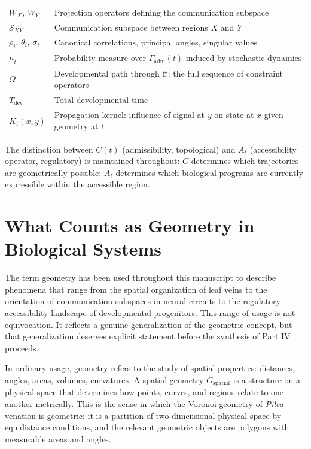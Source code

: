 \documentclass[12pt, a4paper, openany]{book}
\theoremstyle{definition}
\theoremstyle{remark}
\begin{document}
\begin{tabular}{@{}lp{10.5cm}@{}}
$W_X,\,W_Y$ & Projection operators defining the communication subspace \\[4pt]
$\mathcal{S}_{XY}$ & Communication subspace between regions $X$ and $Y$ \\[4pt]
$\rho_i,\,\theta_i,\,\sigma_i$ & Canonical correlations, principal angles, singular values \\[4pt]
$\mu_t$ & Probability measure over $\Gamma_{\mathrm{adm}}(t)$ induced by stochastic dynamics \\[4pt]
$\Omega$ & Developmental path through $\mathcal{C}$: the full sequence of constraint operators \\[4pt]
$T_{\mathrm{dev}}$ & Total developmental time \\[4pt]
$K_t(x,y)$ & Propagation kernel: influence of signal at $y$ on state at $x$ given geometry at $t$ \\[4pt]
\bottomrule
\end{tabular}

\medskip\noindent
The distinction between $C(t)$ (admissibility, topological) and $A_t$ (accessibility operator, regulatory) is maintained throughout: $C$ determines which trajectories are geometrically possible; $A_t$ determines which biological programs are currently expressible within the accessible region.

\section{What Counts as Geometry in Biological Systems}

The term geometry has been used throughout this manuscript to describe phenomena that range from the spatial organization of leaf veins to the orientation of communication subspaces in neural circuits to the regulatory accessibility landscape of developmental progenitors. This range of usage is not equivocation. It reflects a genuine generalization of the geometric concept, but that generalization deserves explicit statement before the synthesis of Part IV proceeds.

In ordinary usage, geometry refers to the study of spatial properties: distances, angles, areas, volumes, curvatures. A spatial geometry $G_{\text{spatial}}$ is a structure on a physical space that determines how points, curves, and regions relate to one another metrically. This is the sense in which the Voronoi geometry of \textit{Pilea} venation is geometric: it is a partition of two-dimensional physical space by equidistance conditions, and the relevant geometric objects are polygons with measurable areas and angles.
\end{document}
